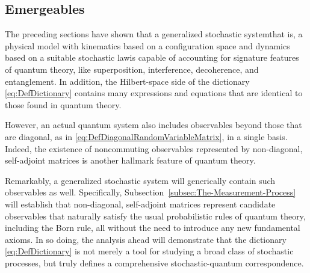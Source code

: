 \documentclass[12pt,english,prl,superscriptaddress,nobibnotes,nofootinbib]{revtex4-2}
\begin{document}
\subsection{Emergeables\label{subsec:Emergeables}}

The preceding sections have shown that a generalized stochastic system\textemdash that
is, a physical model with kinematics based on a configuration space
and dynamics based on a suitable stochastic law\textemdash is capable
of accounting for signature features of quantum theory, like superposition,
interference, decoherence, and entanglement. In addition, the Hilbert-space
side of the dictionary \eqref{eq:DefDictionary} contains many expressions
and equations that are identical to those found in quantum theory. 

However, an actual quantum system also includes observables beyond
those that are diagonal, as in \eqref{eq:DefDiagonalRandomVariableMatrix},
in a single basis. Indeed, the existence of noncommuting observables
represented by non-diagonal, self-adjoint matrices is another hallmark
feature of quantum theory.

Remarkably, a generalized stochastic system will generically contain
such observables as well. Specifically, Subsection~\ref{subsec:The-Measurement-Process}
will establish that non-diagonal, self-adjoint matrices represent
candidate observables that naturally satisfy the usual probabilistic
rules of quantum theory, including the Born rule, all without the
need to introduce any new fundamental axioms. In so doing, the analysis
ahead will demonstrate that the dictionary \eqref{eq:DefDictionary}
is not merely a tool for studying a broad class of stochastic processes,
but truly defines a comprehensive stochastic-quantum correspondence.
\end{document}
